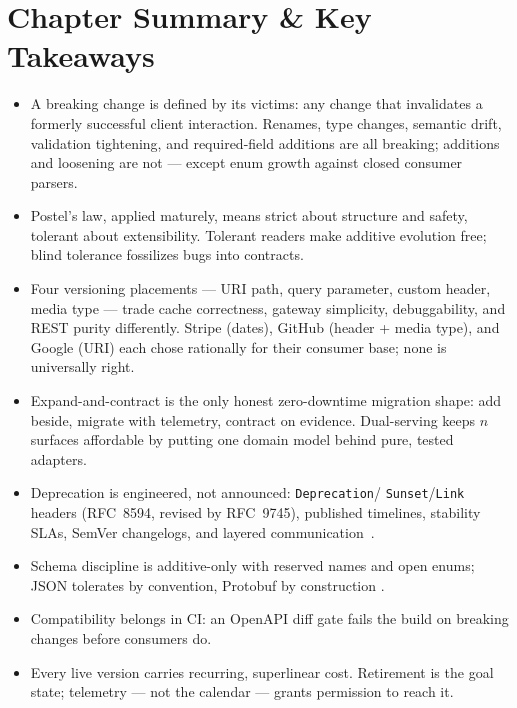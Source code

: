 \section{Chapter Summary \& Key Takeaways}
\label{sec:ch9-summary}

\begin{itemize}
  \item A breaking change is defined by its victims: any change that
        invalidates a formerly successful client interaction. Renames, type
        changes, semantic drift, validation tightening, and required-field
        additions are all breaking; additions and loosening are not ---
        except enum growth against closed consumer parsers.
  \item Postel's law, applied maturely, means strict about structure and
        safety, tolerant about extensibility. Tolerant readers make additive
        evolution free; blind tolerance fossilizes bugs into contracts.
  \item Four versioning placements --- URI path, query parameter, custom
        header, media type --- trade cache correctness, gateway simplicity,
        debuggability, and REST purity differently. Stripe (dates), GitHub
        (header + media type), and Google (URI) each chose rationally for
        their consumer base; none is universally right.
  \item Expand-and-contract is the only honest zero-downtime migration
        shape: add beside, migrate with telemetry, contract on evidence.
        Dual-serving keeps $n$ surfaces affordable by putting one domain
        model behind pure, tested adapters.
  \item Deprecation is engineered, not announced: \texttt{Deprecation}/
        \texttt{Sunset}/\texttt{Link} headers (RFC~8594, revised by
        RFC~9745), published timelines, stability SLAs, SemVer changelogs,
        and layered communication~\cite{rfc8594}.
  \item Schema discipline is additive-only with reserved names and open
        enums; JSON tolerates by convention, Protobuf by construction
        \cite{protobufdocs}.
  \item Compatibility belongs in CI: an OpenAPI diff gate fails the build on
        breaking changes before consumers do.
  \item Every live version carries recurring, superlinear cost. Retirement
        is the goal state; telemetry --- not the calendar --- grants
        permission to reach it.
\end{itemize}

